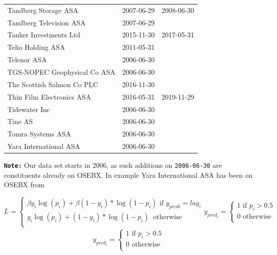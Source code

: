 \begin{table}[H]
\begin{tabularx}{\textwidth}{XXX}
Tandberg Storage ASA & 2007-06-29 & 2008-06-30 \\ 
Tandberg Television ASA & 2007-06-29 &  \\ 
Tanker Investments Ltd & 2015-11-30 & 2017-05-31 \\ 
Telio Holding ASA & 2011-05-31 &  \\ 
Telenor ASA & 2006-06-30 &  \\ 
TGS-NOPEC Geophysical Co ASA & 2006-06-30 &  \\ 
The Scottish Salmon Co PLC & 2016-11-30 &  \\ 
Thin Film Electronics ASA & 2016-05-31 & 2019-11-29 \\ 
Tidewater Inc & 2006-06-30 &  \\ 
Tine AS & 2006-06-30 &  \\ 
Tomra Systems ASA & 2006-06-30 &  \\ 
Yara International ASA & 2006-06-30 &  \\ 
\bottomrule
\end{tabularx}
\end{table}

\textbf{\texttt{Note:}} Our data set starts in 2006, as such additions on \texttt{2006-06-30} are constituents already on OSEBX. In example Yara International ASA has been on OSEBX from 




% 

\begin{equation}
\displaystyle
    L= \left\{
    \begin{array}{c}
    \beta y_{i}\log\left(p_{i}\right)+\beta\left(1-y_{i}\right)\ast \log\left(1-p_{i}\right)    \text{   if   }   y_{pred{i}} = lag_{i} \\
    y_{i}\log\left(p_{i}\right)+\left(1-y_{i}\right)\ast \log\left(1-p_{i}\right)\   \text{    otherwise   }  \\
    \end{array}\right.
    
    y_{pred_i}= \left\{
    \begin{array}{c}
    1    \text{   if   }   p_i > 0.5 \\
    0   \text{    otherwise   }  \\
    \end{array}\right.
\end{equation}
\begin{align*}
\displaystyle
    y_{pred_i}= \left\{
    \begin{array}{c}
    1    \text{   if   }   p_i > 0.5 \\
    0   \text{    otherwise   }  \\
    \end{array}\right.
\end{align*}




